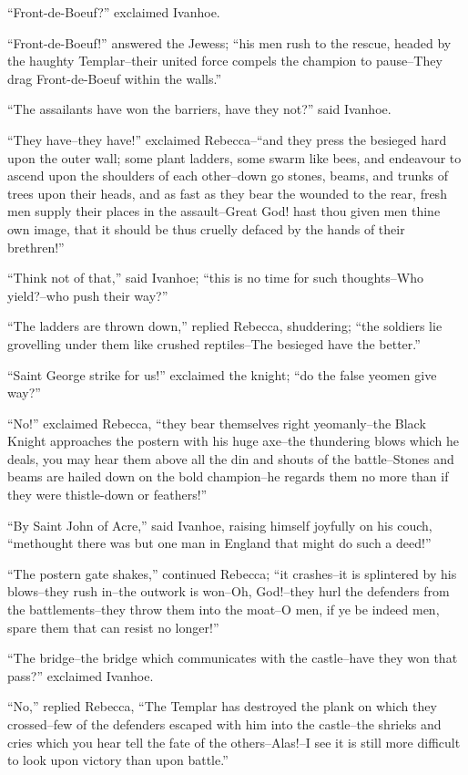 ``Front-de-Boeuf?'' exclaimed Ivanhoe.

``Front-de-Boeuf!'' answered the Jewess; ``his men rush to the rescue,
headed by the haughty Templar--their united force compels the champion
to pause--They drag Front-de-Boeuf within the walls.''

``The assailants have won the barriers, have they not?'' said Ivanhoe.

``They have--they have!'' exclaimed Rebecca--``and they press the
besieged hard upon the outer wall; some plant ladders, some swarm like
bees, and endeavour to ascend upon the shoulders of each other--down go
stones, beams, and trunks of trees upon their heads, and as fast as they
bear the wounded to the rear, fresh men supply their places in the
assault--Great God! hast thou given men thine own image, that it should
be thus cruelly defaced by the hands of their brethren!''

``Think not of that,'' said Ivanhoe; ``this is no time for such
thoughts--Who yield?--who push their way?''

``The ladders are thrown down,'' replied Rebecca, shuddering; ``the
soldiers lie grovelling under them like crushed reptiles--The besieged
have the better.''

``Saint George strike for us!'' exclaimed the knight; ``do the false
yeomen give way?''

``No!'' exclaimed Rebecca, ``they bear themselves right yeomanly--the
Black Knight approaches the postern with his huge axe--the thundering
blows which he deals, you may hear them above all the din and shouts of
the battle--Stones and beams are hailed down on the bold champion--he
regards them no more than if they were thistle-down or feathers!''

``By Saint John of Acre,'' said Ivanhoe, raising himself joyfully on his
couch, ``methought there was but one man in England that might do such a
deed!''

``The postern gate shakes,'' continued Rebecca; ``it crashes--it is
splintered by his blows--they rush in--the outwork is won--Oh,
God!--they hurl the defenders from the battlements--they throw them into
the moat--O men, if ye be indeed men, spare them that can resist no
longer!''

``The bridge--the bridge which communicates with the castle--have they
won that pass?'' exclaimed Ivanhoe.

``No,'' replied Rebecca, ``The Templar has destroyed the plank on which
they crossed--few of the defenders escaped with him into the castle--the
shrieks and cries which you hear tell the fate of the others--Alas!--I
see it is still more difficult to look upon victory than upon battle.''

